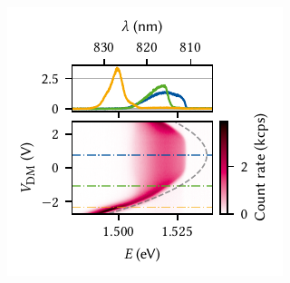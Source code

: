 \begin{marginfigure}
    \centering
    \includegraphics{img/pdf/experiment/doped_M1_05_49-2_difference_mode}
    \caption[
        ,
        .
        .
        \protect\newline
    ]{
        \Gls{pl} as function of difference-mode voltage on a large exciton trap.
        The observed Stark shift follows roughly the expected quadratic dispersion, but is offset by \qty{0.75}{\volt} with respect to zero bias.
        Dashed gray line is a guide to the eye of a parabola with curvature \qty{3.5}{\milli\electronvolt\per\volt\squared}.
        Line cuts in the upper panel are taken at the voltages indicated by dash-dotted lines in the lower.
    }
    \label{fig:exp:pl:doped_M1_05_49-2_difference_mode}
\end{marginfigure}

